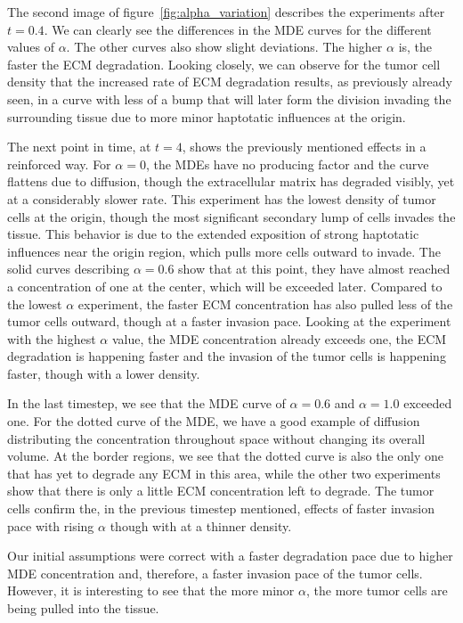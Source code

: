 The second image of figure~\ref{fig:alpha_variation} describes the experiments after $t=0.4$. We can clearly see the differences in the MDE curves for the different values of $\alpha$. The other curves also show slight deviations. The higher $\alpha$ is, the faster the ECM degradation. Looking closely, we can observe for the tumor cell density that the increased rate of ECM degradation results, as previously already seen, in a curve with less of a bump that will later form the division invading the surrounding tissue due to more minor haptotatic influences at the origin.

The next point in time, at $t=4$, shows the previously mentioned effects in a reinforced way. For $\alpha=0$, the MDEs have no producing factor and the curve flattens due to diffusion, though the extracellular matrix has degraded visibly, yet at a considerably slower rate. This experiment has the lowest density of tumor cells at the origin, though the most significant secondary lump of cells invades the tissue. This behavior is due to the extended exposition of strong haptotatic influences near the origin region, which pulls more cells outward to invade.
The solid curves describing $\alpha = 0.6$ show that at this point, they have almost reached a concentration of one at the center, which will be exceeded later. Compared to the lowest $\alpha$ experiment, the faster ECM concentration has also pulled less of the tumor cells outward, though at a faster invasion pace. 
Looking at the experiment with the highest $\alpha$ value, the MDE concentration already exceeds one, the ECM degradation is happening faster and the invasion of the tumor cells is happening faster, though with a lower density.

In the last timestep, we see that the MDE curve of $\alpha=0.6$ and $\alpha=1.0$ exceeded one. For the dotted curve of the MDE, we have a good example of diffusion distributing the concentration throughout space without changing its overall volume. At the border regions, we see that the dotted curve is also the only one that has yet to degrade any ECM in this area, while the other two experiments show that there is only a little ECM concentration left to degrade. 
The tumor cells confirm the, in the previous timestep mentioned, effects of faster invasion pace with rising $\alpha$ though with at a thinner density.


Our initial assumptions were correct with a faster degradation pace due to higher MDE concentration and, therefore, a faster invasion pace of the tumor cells. However, it is interesting to see that the more minor $\alpha$, the more tumor cells are being pulled into the tissue.

